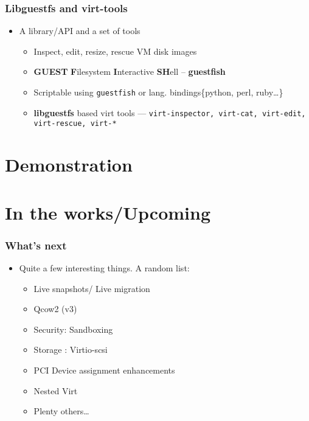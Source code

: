 \documentclass[pdfte x,unicode,minimal,xcolor=table]{beamer}
\begin{document}
\begin{frame}
\frametitle{Libguestfs and virt-tools}
\begin{itemize}
    \item A library/API and a set of tools 
    \begin{itemize} %
    \item Inspect, edit, resize, rescue VM disk images
    \item \textbf{GUEST} \textbf{F}ilesystem \textbf{I}nteractive \textbf{SH}ell -- \textbf{\alert{guestfish}}
    \item Scriptable using \texttt{guestfish} or lang. bindings\{python, perl, ruby\ldots \}
    \item \textbf{libguestfs} based virt tools --- \texttt{virt-inspector, virt-cat, virt-edit,
    virt-rescue, virt-*}
    \end{itemize}
\end{itemize}
\end{frame}


\section{Demonstration}

\section{In the works/Upcoming}
\begin{frame}
    \frametitle{What's next}
\begin{itemize}
    \item Quite a few interesting things. A random list:
    \begin{itemize}%
        \item Live snapshots/ Live migration
        \item Qcow2 (v3)
        \item Security: Sandboxing
        \item Storage : Virtio-scsi
        \item PCI Device assignment enhancements
        \item Nested Virt
        \item \alert{Plenty others\ldots}
    \end{itemize}
\end{itemize}
\end{frame}
\end{document}
